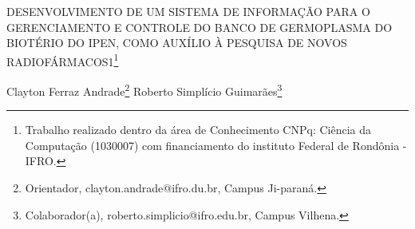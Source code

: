 \documentclass[article,12pt,onesidea,4paper,english,brazil]{abntex2}
\begin{document}
	
	
	\frenchspacing 
	
	\begin{center}
		\LARGE DESENVOLVIMENTO DE UM SISTEMA DE INFORMAÇÃO PARA O
		GERENCIAMENTO E CONTROLE DO BANCO DE GERMOPLASMA DO BIOTÉRIO DO IPEN, COMO AUXÍLIO À PESQUISA DE NOVOS RADIOFÁRMACOS1\footnote{Trabalho realizado dentro da área de Conhecimento CNPq: Ciência da Computação (1030007) com
		financiamento do instituto Federal de Rondônia - IFRO.}
		
		\normalsize
		Clayton Ferraz Andrade\footnote{Orientador, clayton.andrade@ifro.du.br, Campus Ji-paraná.} 
		Roberto Simplício Guimarães\footnote{Colaborador(a), roberto.simplicio@ifro.edu.br, Campus Vilhena.} 
	\end{center}
	
\end{document}
